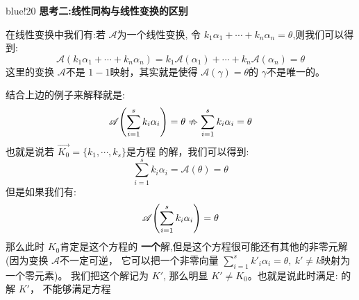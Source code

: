 \begin{formal}{blue!20}
    \textbf{思考二:线性同构与线性变换的区别}\par 
    在线性变换中我们有:若 $\mathscr{A}$为一个线性变换,
    令 $k_1\alpha_1 + \cdots + k_n\alpha_n = \theta$,则我们可以得到:
    \[
        \mathscr{A}(k_1\alpha_1 + \cdots + k_n\alpha_n) = k_1\mathscr{A}(\alpha_1) + \cdots + k_n\mathscr{A}(\alpha_n) = \theta   
    \] 
    这里的变换 $\mathscr{A}$不是 $1-1$映射，其实就是使得 $\mathscr{A}(\gamma)=\theta$的 $\gamma$不是唯一的。

    结合上边的例子来解释就是:
    \[
        \mathscr{A}\displaystyle{\left(\sum_{i=1}^{s}{k_i\alpha_i}\right) = \theta \nRightarrow \sum_{i=1}^{s}{k_i\alpha_i}=\theta} 
    \]
    也就是说若 $\vec{K_0} = \{k_1, \cdots, k_s\}$是方程 的解，我们可以得到:
    \[
        \sum_{i=1}^{s}{k_i\alpha_i} = \mathscr{A}(\theta) = \theta
    \]
    但是如果我们有:
    \[
        \mathscr{A}\displaystyle{\left(\sum_{i=1}^{s}{k_i\alpha_i}\right)} = \theta
    \]
    那么此时 $K_0$肯定是这个方程的 \textbf{一个}解,但是这个方程很可能还有其他的非零元解
    (因为变换 $\mathscr{A}$不一定可逆， 它可以把一个非零向量 ${\sum\limits_{i=1}^{s}{k'_i\alpha_i}=\theta,~k'\neq k}$映射为一个零元素)。
    我们把这个解记为 $K'$, 那么明显 $K'\neq K_0$。也就是说此时满足:
    的解 $K'$， 不能够满足方程
\end{formal}

\clearpage